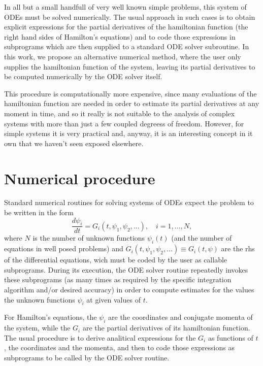 \documentclass{iopart}
\begin{document}
In all but a small handfull of very well known simple problems, this system of
ODEs must be solved numerically. The usual approach in such cases is to obtain
explicit expressions for the partial derivatives of the hamiltonian function
(the right hand sides of Hamilton's equations) and to code those expressions in
subprograms which are then supplied to a standard ODE solver subroutine. In this
work, we propose an alternative numerical method, where the user only supplies
the hamiltonian function of the system, leaving its partial derivatives to be
computed numerically by the ODE solver itself.

This procedure is computationally more expensive, since many evaluations of the
hamiltonian function are needed in order to estimate its partial derivatives at
any moment in time, and so it really is not suitable to the analysis of complex
systems with more than just a few coupled degreess of freedom. However, for
simple systems it is very practical and, anyway, it is an interesting concept in
it own that we haven't seen exposed elsewhere.

\section{Numerical procedure}
Standard numerical routines for solving systems of ODEs expect the problem to be
written in the form
\begin{equation}\label{eq:numheqs}
  \frac{d\psi_i}{dt}=G_i(t, \psi_1, \psi_2, \ldots),\quad i=1, \ldots, N,
\end{equation}
where $N$ is the number of unknown functions $\psi_i(t)$ (and the number of
equations in well posed problems) and $G_i(t, \psi_1, \psi_2, \ldots)\equiv
G_i(t,\psi)$ are the rhs of the differential equations, wich must be coded by
the user as callable subprograms. During its execution, the ODE solver routine
repeatedly invokes these subprograms (as many times as required by the specific
integration algorithm and/or desired accuracy) in order to compute estimates for
the values the unknown functions $\psi_i$ at given values of $t$.

For Hamilton's equations, the $\psi_i$ are the coordinates and conjugate momenta
of the system, while the $G_i$ are the partial derivatives of its hamiltonian
function. The usual procedure is to derive analitical expressions for the $G_i$
as functions of $t$, the coordinates and the momenta, and then to code those
expressions as subprograms to be called by the ODE solver routine.
\end{document}
